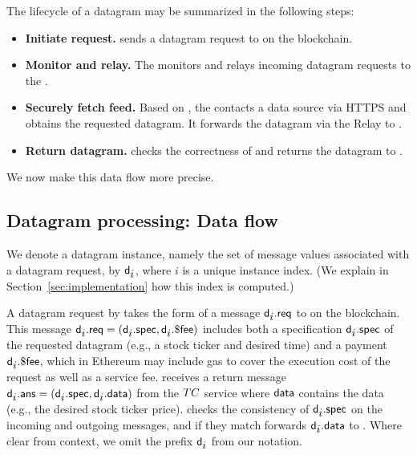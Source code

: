 The lifecycle of a datagram may be summarized in the following steps:

\begin{itemize}
\item {\bf Initiate request.} \reqcont sends a datagram request to \tcont on the blockchain.

\item {\bf Monitor and relay.} The \medname monitors \tcont and relays incoming datagram requests to the \encname.

\item {\bf Securely fetch feed.} Based on \dgform, the \encname contacts a data source via HTTPS and obtains the requested datagram. It forwards the datagram via the Relay to \tcont.

\item {\bf Return datagram.} \tcont checks the correctness of \dgform and returns the datagram to \reqcont.
\end{itemize}



We now make this data flow more precise. 

\subsection{Datagram processing: Data flow}

We denote a datagram instance, namely the set of message values associated with a datagram request, by ${\sf d_{\mbox{$i$}}}$, where $i$ is a unique instance index. (We explain in Section~\ref{sec:implementation} how this index is computed.) 

A datagram request by \reqcont takes the form of a message ${\sf d_{\mbox{$i$}}}.{\sf req}$ to \tcont on the blockchain. This message ${\sf d_{\mbox{$i$}}}.{\sf req} = ({\sf d_{\mbox{$i$}}}.{\sf spec}, {\sf d_{\mbox{$i$}}}.{\sf \$fee})$ includes both a specification ${\sf d_{\mbox{$i$}}}.{\sf spec}$ of the requested datagram (e.g., a stock ticker and desired time) and a payment ${\sf d_{\mbox{$i$}}}.{\sf \$fee}$, which in Ethereum may include gas to cover the execution cost of the request as well as a service fee. \tcont receives a return message ${\sf d_{\mbox{$i$}}}.{\sf ans} = ({\sf d_{\mbox{$i$}}}.{\sf spec}, {\sf d_{\mbox{$i$}}}.{\sf data})$ from the $TC$ service where ${\sf data}$ contains the data (e.g., the desired stock ticker price). \tcont checks the consistency of ${\sf d_{\mbox{$i$}}}.{\sf spec}$ on the incoming and outgoing messages, and if they match forwards ${\sf d_{\mbox{$i$}}}.{\sf data}$ to \reqcont. Where clear from context, we omit the prefix ${\sf d_{\mbox{$i$}}}$ from our notation.

